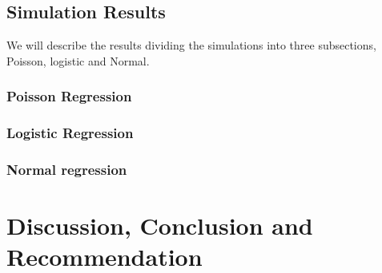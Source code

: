 \documentclass[a4paper,12pt,openany]{report}
\theoremstyle{plain}
\theoremstyle{plain}
\theoremstyle{plain}
\theoremstyle{plain}
\theoremstyle{plain}
\theoremstyle{plain}
\theoremstyle{plain}
\theoremstyle{plain}
\theoremstyle{plain}
\theoremstyle{plain}
\theoremstyle{plain}
\theoremstyle{plain}
\begin{document}
\section{Simulation Results}
We will describe the results dividing the simulations into three subsections, Poisson, logistic and Normal.
\subsection{Poisson Regression}

\subsection{Logistic Regression}
\subsection{Normal regression}








\chapter{Discussion, Conclusion and Recommendation}

	
	 \begin{thebibliography}{1,2,3,...}
		
	\end{thebibliography}
\end{document}
